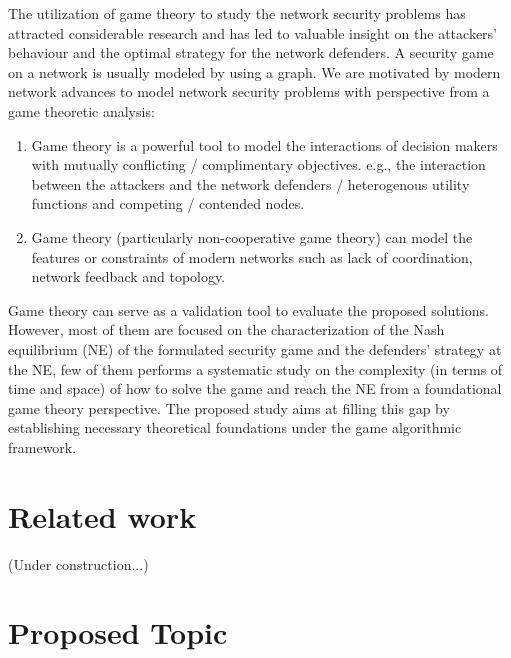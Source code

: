 \documentclass[10pt]{article}
\theoremstyle{definition}
\begin{document}
The utilization of game theory to study the network security problems has attracted considerable 
research and has led to valuable insight on the attackers’ behaviour and the optimal strategy for 
the network defenders. A security game on a network 
is usually modeled by using a graph. We are motivated by modern network advances
to model network security problems with perspective from a game theoretic
analysis:
\begin{enumerate}
	\item Game theory is a powerful tool to model the 
interactions of decision makers with mutually conflicting / complimentary objectives.
 e.g., the interaction between the attackers and the network defenders /
 heterogenous utility functions and competing / contended nodes.
	\item Game theory (particularly non-cooperative game theory) can model the
    features or constraints of modern networks such as lack of coordination,
    network feedback and topology.
\end{enumerate}

Game theory can serve as a validation tool to evaluate the proposed solutions.
However, most of them are focused on the characterization of the Nash equilibrium (NE) of the formulated security game and the defenders’ strategy at the NE, few of them performs a systematic study on the
complexity (in terms of time and space) of how to solve the game and reach the
NE from a foundational game theory perspective. The proposed study aims at filling this gap by establishing necessary theoretical foundations under the game algorithmic framework.


\section{Related work}

(Under construction...)

\section{Proposed Topic}
\end{document}
